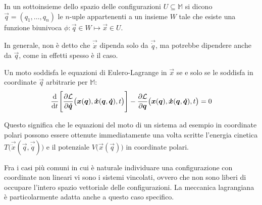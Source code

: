 \begin{definition}
  In un sottoinsieme dello spazio delle configurazioni $U \subseteq \mathbb{M}$ si dicono  $\vec{q}=(q_1, \ldots, q_n)$ le $n$-uple appartenenti a un insieme $W$ tale che esiste una funzione biunivoca $\phi: \vec{q} \in W \mapsto \vec{x}\in U$.
\end{definition}
\begin{remark}
  In generale, non è detto che $\vec{\dot{x}}$ dipenda solo da $\vec{\dot{q}}$, ma potrebbe dipendere anche da $\vec{q}$, come in effetti spesso è il caso.
\end{remark}
\begin{theorem}
  Un moto soddisfa le equazioni di Eulero-Lagrange in $\vec{x}$ se e solo se le soddisfa in coordinate $\vec{q}$ arbitrarie per $\mathbb{M}$: \begin{equation}
    \dv{t}\Bigg[\pdv{\mathcal{L}}{\boldsymbol{\dot{q}}}()\big(\boldsymbol{x}(\boldsymbol{q}), \boldsymbol{\dot{x}}(\boldsymbol{q},\boldsymbol{\dot{q}}), t\big)\Bigg] - \pdv{\mathcal{L}}{\boldsymbol{q}}()\big(\boldsymbol{x}(\boldsymbol{q}), \boldsymbol{\dot{x}}(\boldsymbol{q},\boldsymbol{\dot{q}}), t\big) = 0
  \end{equation} 
\end{theorem}

Questo significa che le equazioni del moto di un sistema ad esempio in coordinate polari possono essere ottenute immediatamente una volta scritte l'energia cinetica $T\big(\vec{\dot{x}}(\vec{q},\vec{\dot{q}})\big)$ e il potenziale $V\big(\vec{x}(\vec{q})\big)$ in coordinate polari.

Fra i casi più comuni in cui è naturale individuare una configurazione con coordinate non lineari vi sono i sistemi vincolati, ovvero che non sono liberi di occupare l'intero spazio vettoriale delle configurazioni. La meccanica lagrangiana è particolarmente adatta anche a questo caso specifico.

